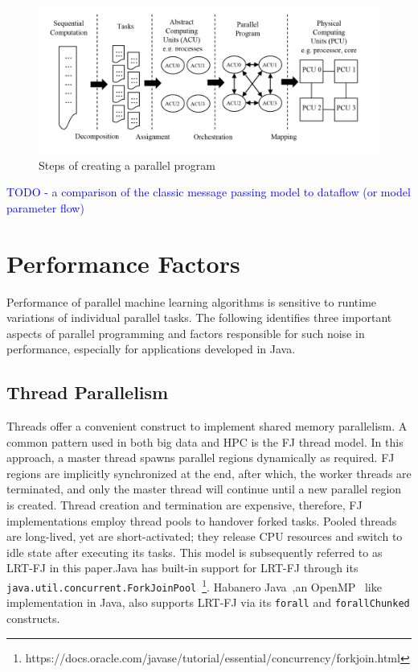 \documentclass[10pt, conference, compsocconf]{IEEEtran}
\begin{document}
\begin{figure}[!h]
\centering
\includegraphics[width=0.9\columnwidth]{images/fig_parallel_decompose}
\caption{Steps of creating a parallel program
\label{fig:fig_steps_of_creating_a_parallel_program}}
\end{figure}

\textcolor{blue}{TODO - a comparison of the classic message passing model to dataflow (or model parameter flow)}

\section{Performance Factors} \label{sec:factors}

Performance of parallel machine learning algorithms is sensitive to runtime variations of individual parallel tasks. The following identifies three important aspects of parallel programming and factors responsible for such noise in performance, especially for applications developed in Java.

\subsection{Thread Parallelism}
Threads offer a convenient construct to implement shared memory parallelism. A common pattern used in both big data and \ac{HPC} is the \ac{FJ} thread model. In this approach, a master thread spawns parallel regions dynamically as required. \ac{FJ} regions are implicitly synchronized at the end, after which, the worker threads are terminated, and only the master thread will continue until a new parallel region is created. Thread creation and termination are expensive, therefore, \ac{FJ} implementations employ thread pools to handover forked tasks. Pooled threads are long-lived, yet are short-activated; they release \acs{CPU} resources and switch to idle state after executing its tasks. This model is subsequently referred to as \ac{LRT-FJ} in this paper.Java has built-in support for \ac{LRT-FJ} through its \texttt{java.util.concurrent.ForkJoinPool}~\footnote{https://docs.oracle.com/javase/tutorial/essential/concurrency/forkjoin.html}. Habanero Java~\cite{Imam:2014:HLJ:2647508.2647514},an OpenMP~\cite{Dagum:1998:OIA:615255.615542} like implementation in Java, also supports \ac{LRT-FJ} via its \texttt{forall} and \texttt{forallChunked} constructs.
\end{document}
